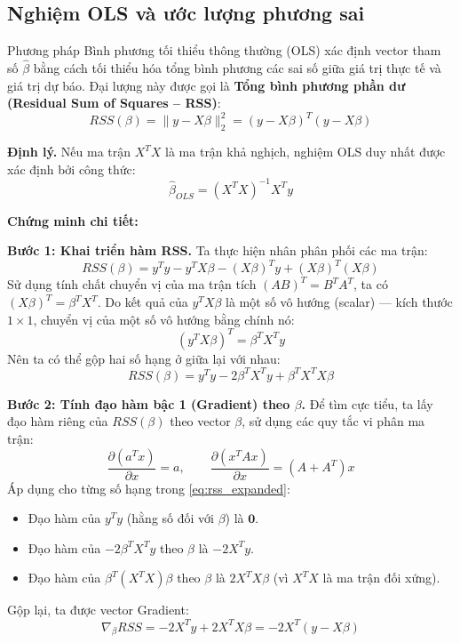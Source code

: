 \documentclass[a4paper]{article}
\begin{document}
\subsection{Nghiệm OLS và ước lượng phương sai}

Phương pháp Bình phương tối thiểu thông thường (OLS) xác định vector tham số $\hat{\beta}$ bằng cách tối thiểu hóa tổng bình phương các sai số giữa giá trị thực tế và giá trị dự báo. Đại lượng này được gọi là \textbf{Tổng bình phương phần dư (Residual Sum of Squares -- RSS)}:
\begin{equation}
RSS(\beta) = \lVert y - X\beta \rVert_2^2 = (y - X\beta)^T(y - X\beta)
\end{equation}

\textbf{Định lý.} Nếu ma trận $X^TX$ là ma trận khả nghịch, nghiệm OLS duy nhất được xác định bởi công thức:
\begin{equation}
\hat{\beta}_{OLS} = (X^TX)^{-1}X^Ty
\end{equation}

\textbf{Chứng minh chi tiết:}

\textbf{Bước 1: Khai triển hàm RSS.}
Ta thực hiện nhân phân phối các ma trận:
$$RSS(\beta) = y^Ty - y^TX\beta - (X\beta)^Ty + (X\beta)^T(X\beta)$$
Sử dụng tính chất chuyển vị của ma trận tích $(AB)^T = B^TA^T$, ta có $(X\beta)^T = \beta^TX^T$. Do kết quả của $y^TX\beta$ là một số vô hướng (scalar) --- kích thước $1 \times 1$, chuyển vị của một số vô hướng bằng chính nó:
$$(y^TX\beta)^T = \beta^TX^Ty$$
Nên ta có thể gộp hai số hạng ở giữa lại với nhau:
\begin{equation}\label{eq:rss_expanded}
RSS(\beta) = y^Ty - 2\beta^TX^Ty + \beta^TX^TX\beta
\end{equation}

\textbf{Bước 2: Tính đạo hàm bậc 1 (Gradient) theo $\beta$.}
Để tìm cực tiểu, ta lấy đạo hàm riêng của $RSS(\beta)$ theo vector $\beta$, sử dụng các quy tắc vi phân ma trận:
$$\frac{\partial (a^Tx)}{\partial x} = a, \qquad \frac{\partial (x^TAx)}{\partial x} = (A + A^T)x$$
Áp dụng cho từng số hạng trong \eqref{eq:rss_expanded}:
\begin{itemize}
    \item Đạo hàm của $y^Ty$ (hằng số đối với $\beta$) là $\mathbf{0}$.
    \item Đạo hàm của $-2\beta^TX^Ty$ theo $\beta$ là $-2X^Ty$.
    \item Đạo hàm của $\beta^T(X^TX)\beta$ theo $\beta$ là $2X^TX\beta$ (vì $X^TX$ là ma trận đối xứng).
\end{itemize}
Gộp lại, ta được vector Gradient:
\begin{equation}\label{eq:gradient_rss}
\nabla_{\beta}RSS = -2X^Ty + 2X^TX\beta = -2X^T(y - X\beta)
\end{equation}
\end{document}
